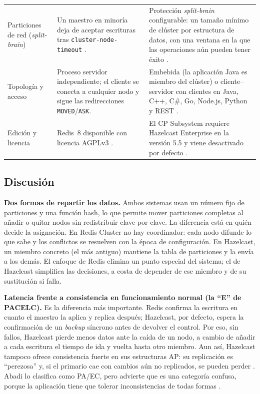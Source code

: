 \documentclass[11pt,a4paper]{article}
\begin{document}
\begin{table}[H]
\begin{tabularx}{\linewidth}{>{\bfseries\raggedright\arraybackslash}p{2.6cm} >{\raggedright\arraybackslash}X >{\raggedright\arraybackslash}X}
    Particiones de red (\emph{split-brain}) &
      Un maestro en minoría deja de aceptar escrituras tras
      \texttt{cluster-node-timeout} \cite{redis2026clusterspec}. &
      Protección \emph{split-brain} configurable: un tamaño mínimo de
      clúster por estructura de datos, con una ventana en la que las
      operaciones aún pueden tener éxito \cite{hazelcast2026splitbrain}. \\
    Topología y acceso &
      Proceso servidor independiente; el cliente se conecta a cualquier nodo
      y sigue las redirecciones \texttt{MOVED}/\texttt{ASK}. &
      Embebida (la aplicación Java es miembro del clúster) o
      cliente--servidor con clientes en Java, C++, C\#, Go, Node.js, Python y
      REST \cite{hazelcast2026topology}. \\
    Edición y licencia &
      Redis~8 disponible con licencia AGPLv3 \cite{trollope2025agpl}. &
      El CP Subsystem requiere Hazelcast Enterprise en la versión 5.5 y viene
      desactivado por defecto \cite{hazelcast2026cpsubsystem}. \\
    \bottomrule
  \end{tabularx}
\end{table}

\subsection{Discusión}

\textbf{Dos formas de repartir los datos.} Ambos sistemas usan un número
fijo de particiones y una función hash, lo que permite mover particiones
completas al añadir o quitar nodos sin redistribuir clave por clave. La
diferencia está en quién decide la asignación. En Redis Cluster no hay
coordinador: cada nodo difunde lo que sabe y los conflictos se resuelven con
la época de configuración. En Hazelcast, un miembro concreto (el más antiguo)
mantiene la tabla de particiones y la envía a los demás. El enfoque de Redis
elimina un punto especial del sistema; el de Hazelcast simplifica las
decisiones, a costa de depender de ese miembro y de su sustitución si falla.

\textbf{Latencia frente a consistencia en funcionamiento normal (la ``E'' de
PACELC).} Es la diferencia más importante. Redis confirma la escritura en
cuanto el maestro la aplica y replica después; Hazelcast, por defecto, espera
la confirmación de un \emph{backup} síncrono antes de devolver el control.
Por eso, sin fallos, Hazelcast pierde menos datos ante la caída de un nodo, a
cambio de añadir a cada escritura el tiempo de ida y vuelta hasta otro
miembro. Aun así, Hazelcast tampoco ofrece consistencia fuerte en sus
estructuras AP: su replicación es ``perezosa'' y, si el primario cae con
cambios aún no replicados, se pueden perder \cite{hazelcast2026replicationalgorithm}.
Abadi lo clasifica como PA/EC, pero advierte que es una categoría confusa,
porque la aplicación tiene que tolerar inconsistencias de todas formas
\cite{abadi2017hazelcast}.
\end{document}
